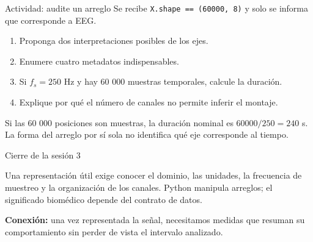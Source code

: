 \documentclass[
  ignorenonframetext,
  aspectratio=169,
  spanish,
  professionalfonts]{beamer}
\providecommand{\tightlist}{%
  \setlength{\itemsep}{0pt}\setlength{\parskip}{0pt}}
\begin{document}
\begin{frame}[fragile]{Actividad: audite un arreglo}
\protect{}\label{actividad-audite-un-arreglo}
Se recibe \texttt{X.shape\ ==\ (60000,\ 8)} y solo se informa que
corresponde a EEG.

\begin{enumerate}
\tightlist
\item
  Proponga dos interpretaciones posibles de los ejes.
\item
  Enumere cuatro metadatos indispensables.
\item
  Si \(f_s=250\) Hz y hay 60 000 muestras temporales, calcule la
  duración.
\item
  Explique por qué el número de canales no permite inferir el montaje.
\end{enumerate}

\begin{tcolorbox}[enhanced jigsaw, arc=.35mm, bottomrule=.15mm, bottomtitle=1mm, breakable, colback=white, colbacktitle=quarto-callout-note-color!10!white, colframe=quarto-callout-note-color-frame, coltitle=black, left=2mm, leftrule=.75mm, opacityback=0, opacitybacktitle=0.6, rightrule=.15mm, title={Respuesta parcial}, titlerule=0mm, toprule=.15mm, toptitle=1mm]

Si las 60 000 posiciones son muestras, la duración nominal es
\(60000/250=240\) s. La forma del arreglo por sí sola no identifica qué
eje corresponde al tiempo.

\end{tcolorbox}
\end{frame}

\begin{frame}{Cierre de la sesión 3}
\protect{}\label{cierre-de-la-sesiuxf3n-3}
\begin{tcolorbox}[enhanced jigsaw, arc=.35mm, bottomrule=.15mm, bottomtitle=1mm, breakable, colback=white, colbacktitle=quarto-callout-important-color!10!white, colframe=quarto-callout-important-color-frame, coltitle=black, left=2mm, leftrule=.75mm, opacityback=0, opacitybacktitle=0.6, rightrule=.15mm, title={Síntesis}, titlerule=0mm, toprule=.15mm, toptitle=1mm]

Una representación útil exige conocer el dominio, las unidades, la
frecuencia de muestreo y la organización de los canales. Python manipula
arreglos; el significado biomédico depende del contrato de datos.

\end{tcolorbox}

\textbf{Conexión:} una vez representada la señal, necesitamos medidas
que resuman su comportamiento sin perder de vista el intervalo
analizado.
\end{frame}
\end{document}
